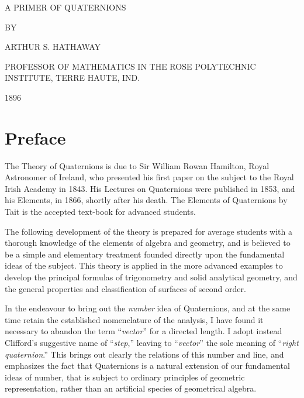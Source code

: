 \documentclass[oneside,12pt]{book}[2005/09/16]
\begin{document}

\newpage

\begin{center}
\bigskip \huge
A PRIMER OF QUATERNIONS

\bigskip\bigskip
\footnotesize BY

\bigskip
\large ARTHUR S. HATHAWAY

\bigskip
\footnotesize PROFESSOR OF MATHEMATICS IN THE ROSE POLYTECHNIC \\
INSTITUTE, TERRE HAUTE, IND.

\bigskip\bigskip
\normalsize 1896
\end{center}

\newpage

\pagestyle{plain}

\section*{Preface}

The Theory of Quaternions is due to Sir William Rowan Hamilton,
Royal Astronomer of Ireland, who presented his first paper on the
subject to the Royal Irish Academy in 1843. His Lectures on
Quaternions were published in 1853, and his Elements, in 1866,
shortly after his death. The Elements of Quaternions by Tait is
the accepted text-book for advanced students.

The following development of the theory is prepared for average
students with a thorough knowledge of the elements of algebra and
geometry, and is believed to be a simple and elementary treatment
founded directly upon the fundamental ideas of the subject. This
theory is applied in the more advanced examples to develop the
principal formulas of trigonometry and solid analytical geometry,
and the general properties and classification of surfaces of
second order.

In the endeavour to bring out the \textit{number} idea of
Quaternions, and at the same time retain the established
nomenclature of the analysis, I have found it necessary to abandon
the term ``\textit{vector}'' for a directed length. I adopt
instead Clifford's suggestive name of ``\textit{step},'' leaving
to ``\textit{vector}'' the sole meaning of ``\textit{right
quaternion}.'' This brings out clearly the relations of this
number and line, and emphasizes the fact that Quaternions is a
natural extension of our fundamental ideas of number, that is
subject to ordinary principles of geometric representation, rather
than an artificial species of geometrical algebra.


\end{document}
\end{document}
